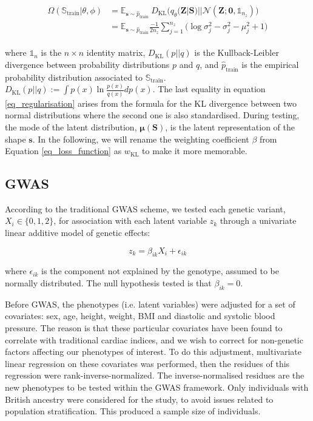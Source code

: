 \begin{align}
\begin{split}
\Omega(\mathbb{S}_\text{train}|\theta, \phi)&= \mathbb{E}_{\mathbf{s}\sim\hat{p}_{\text{train}}}\
D_{\text{KL}}\Big(q_{\theta}(\textbf{Z}|\textbf{S})||\mathcal{N}(\mathbf{Z};\mathbf{0}, \mathbb{1}_{n_z})\Big)\\
&=\mathbb{E}_{\mathbf{s}\sim\hat{p}_{\text{train}}}
\frac{-1}{2n_z}\sum_{j=1}^{n_z}\Big(\log\sigma^2_j-\sigma^2_j-\mu^2_j+1\Big)
\label{eq_regularisation}
\end{split}
\end{align}

\noindent where $\mathbb{1}_{n}$ is the $n\times n$ identity matrix, $D_{\text{KL}}(p||q)$ is the Kullback-Leibler divergence between probability distributions $p$ and $q$, and $\hat{p}_{\text{train}}$ is the empirical probability distribution associated to $\mathbb{S}_\text{train}$.
$D_{\text{KL}}(p||q):=\int p(x)\ln{\frac{p(x)}{q(x)}}dp(x)$. The last equality in equation \ref{eq_regularisation} arises
from the formula for the KL divergence between two normal distributions where the second one is also standardised. During testing, the mode of the latent distribution, $\pmb{\mu}(\textbf{S})$, is the latent representation of the shape $\textbf{s}$. In the following, we will rename the weighting coefficient $\beta$ from Equation \ref{eq_loss_function} as $w_{\text{KL}}$ to make it more memorable.

\subsection{GWAS}
According to the traditional GWAS scheme, we tested each genetic variant, $X_i\in\{0,1,2\}$, for association with each latent variable $z_k$ through a univariate linear additive model of genetic effects:

\begin{equation}
z_k = \beta_{ik}X_i+\epsilon_{ik}
\label{eq_gwas}
\end{equation}

\noindent where $\epsilon_{ik}$ is the component not explained by the genotype, assumed to be normally distributed. The null hypothesis tested is that $\beta_{ik}=0$. 

Before GWAS, the phenotypes (i.e. latent variables) were adjusted for a set of covariates: sex, age, height, weight, BMI and diastolic and systolic blood pressure. The reason is that these particular covariates have been found to correlate with traditional cardiac indices, and we wish to correct for non-genetic factors affecting our phenotypes of interest. To do this adjustment, multivariate linear regression on these covariates was performed, then the residues of this regression were rank-inverse-normalized. The inverse-normalised residues are the new phenotypes to be tested within the GWAS framework. Only individuals with British ancestry were considered for the study, to avoid issues related to population stratification. This produced a sample size of \NCMRGBR individuals.

